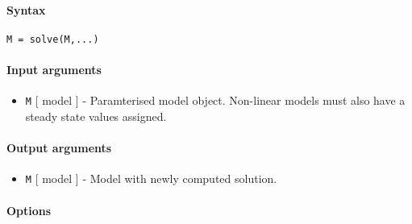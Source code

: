 


	\paragraph{Syntax}

\begin{verbatim}
M = solve(M,...)
\end{verbatim}

\paragraph{Input arguments}

\begin{itemize}
\itemsep1pt\parskip0pt
\item
  \texttt{M} {[} model {]} - Paramterised model object. Non-linear
  models must also have a steady state values assigned.
\end{itemize}

\paragraph{Output arguments}

\begin{itemize}
\itemsep1pt\parskip0pt
\item
  \texttt{M} {[} model {]} - Model with newly computed solution.
\end{itemize}

\paragraph{Options}

